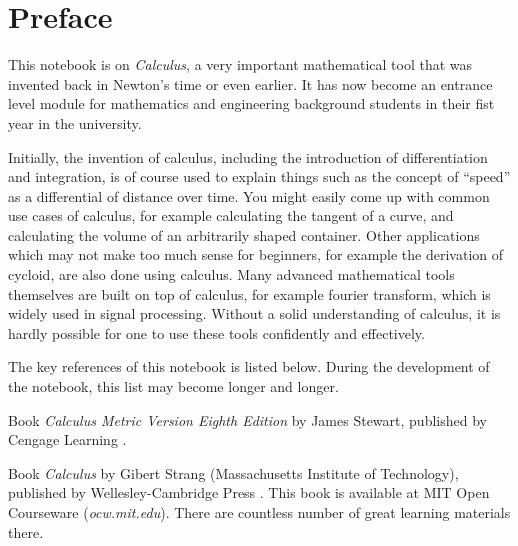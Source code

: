 \chapter*{Preface}

This notebook is on \textit{Calculus}, a very important mathematical tool that was invented back in Newton's time or even earlier. It has now become an entrance level module for mathematics and engineering background students in their fist year in the university.

Initially, the invention of calculus, including the introduction of differentiation and integration, is of course used to explain things such as the concept of ``speed'' as a differential of distance over time. You might easily come up with common use cases of calculus, for example calculating the tangent of a curve, and calculating the volume of an arbitrarily shaped container. Other applications which may not make too much sense for beginners, for example the derivation of cycloid, are also done using calculus. Many advanced mathematical tools themselves are built on top of calculus, for example fourier transform, which is widely used in signal processing. Without a solid understanding of calculus, it is hardly possible for one to use these tools confidently and effectively.

The key references of this notebook is listed below. During the development of the notebook, this list may become longer and longer.

Book \textit{Calculus Metric Version Eighth Edition} by James Stewart, published by Cengage Learning \cite{stewart2015calculus}.

Book \textit{Calculus} by Gibert Strang (Massachusetts Institute of Technology), published by Wellesley-Cambridge Press \cite{strangt1991calculus}. This book is available at MIT Open Courseware (\textit{ocw.mit.edu}). There are countless number of great learning materials there. 